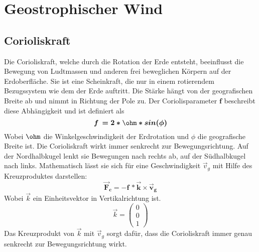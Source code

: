 %
%
%
%
\section{Geostrophischer Wind
\label{geostrophisch:section:geoWind}}


\subsection{Corioliskraft
\label{geostrophisch:subsection:coriolis}}
Die Corioliskraft, welche durch die Rotation der Erde entsteht, beeinflusst die Bewegung von Ludtmassen und anderen frei beweglichen Körpern auf der Erdoberfläche. Sie ist eine Scheinkraft, die nur in einem rotierendem Bezugssystem wie dem der Erde auftritt. Die Stärke hängt von der geografischen Breite ab und nimmt in Richtung der Pole zu.
Der Coriolisparameter $\boldsymbol{f}$ beschreibt diese Abhängigkeit und ist definiert als 
\begin{equation}
\boldsymbol{
f\, 
= 
2*\ohm*sin(\phi)
}
\label{geostrophisch:equation1}
\end{equation}
Wobei $\ohm$ die Winkelgeschwindigkeit der Erdrotation und $\phi$ die geografische Breite ist.
Die Corioliskraft wirkt immer senkrecht zur Bewegungsrichtung. Auf der Nordhalbkugel lenkt sie Bewegungen nach rechts ab, auf der Südhalbkugel nach links. Mathematisch lässt sie sich für eine Geschwindigkeit $\vec{v}_g $ mit Hilfe des Kreuzproduktes darstellen:
\begin{equation}
\boldsymbol{
\vec{F}_c 
= 
-f\, *\vec{k} \times \vec{v}_g 
}
\label{geostrophisch:equation2}
\end{equation}
Wobei $\vec{k}$ ein Einheitsvektor in Vertikalrichtung ist.
\begin{equation}
\vec{k} =
\left(
\begin{array}{c}
0 \\
0 \\
1
\end{array}
\right)
\label{geostrophisch:equation4}
\end{equation}
Das Kreuzprodukt von $\vec{k}$ mit  $\vec{v}_g $ sorgt dafür, dass die Corioliskraft immer genau senkrecht zur Bewegungsrichtung wirkt.
